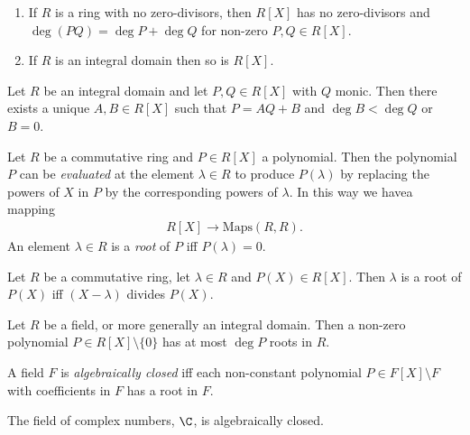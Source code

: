 \documentclass{article}
\begin{document}
\begin{lemma}
	\begin{enumerate}
		\item If $R$ is a ring with no zero-divisors, then $R[X]$ has no zero-divisors
		      and $\deg(PQ)=\deg P + \deg Q$ for non-zero $P,Q\in R[X]$.
		\item If $R$ is an integral domain then so is $R[X]$.
	\end{enumerate}
\end{lemma}

\begin{theorem}[Notes 3.3.4]
	Let $R$ be an integral domain and let $P,Q\in R[X]$ with $Q$ monic. Then there exists
	a unique $A,B\in R[X]$ such that $P=AQ+B$ and $\deg B<\deg Q$ or $B=0$.
\end{theorem}

\begin{definition}
	Let $R$ be a commutative ring and $P\in R[X]$ a polynomial. Then the polynomial $P$
	can be \emph{evaluated} at the element $\lambda\in R$ to produce $P(\lambda)$
	by replacing the powers of $X$ in $P$ by the corresponding powers of $\lambda$.
	In this way we havea mapping
	\begin{align*}
		R[X] \to \text{Maps}(R,R).
	\end{align*}
	An element $\lambda\in R$ is a \emph{root} of $P$ iff $P(\lambda) = 0$.
\end{definition}

\begin{proposition}[Notes 3.3.9]
	Let $R$ be a commutative ring, let $\lambda\in R$ and $P(X)\in R[X]$. Then $\lambda$
	is a root of $P(X)$ iff $(X-\lambda)$ divides $P(X)$.
\end{proposition}

\begin{theorem}[Notes 3.3.10]
	Let $R$ be a field, or more generally an integral domain. Then a non-zero polynomial
	$P\in R[X]\setminus\{0\}$ has at most $\deg P$ roots in $R$.
\end{theorem}

\begin{definition}
	A field $F$ is \emph{algebraically closed} iff each non-constant polynomial $P\in F[X]\setminus F$
	with coefficients in $F$ has a root in $F$.
\end{definition}

\begin{theorem}
	The field of complex numbers, $\C$, is algebraically closed.
\end{theorem}
\end{document}
